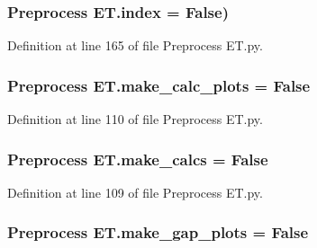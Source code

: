 \hypertarget{namespace_preprocess_01_e_t_aadaeace54973ac1d38ec6c6b5267a119}{}
\subsubsection[{index}]{\setlength{\rightskip}{0pt plus 5cm}Preprocess E\+T.\+index = False)}\label{namespace_preprocess_01_e_t_aadaeace54973ac1d38ec6c6b5267a119}


Definition at line 165 of file Preprocess E\+T.\+py.

\hypertarget{namespace_preprocess_01_e_t_a56359fcc3c93b1624e18648ebd54b0ac}{}
\subsubsection[{make\+\_\+calc\+\_\+plots}]{\setlength{\rightskip}{0pt plus 5cm}Preprocess E\+T.\+make\+\_\+calc\+\_\+plots = False}\label{namespace_preprocess_01_e_t_a56359fcc3c93b1624e18648ebd54b0ac}


Definition at line 110 of file Preprocess E\+T.\+py.

\hypertarget{namespace_preprocess_01_e_t_a9232b305c8f0040028a54ba9cbaadf09}{}
\subsubsection[{make\+\_\+calcs}]{\setlength{\rightskip}{0pt plus 5cm}Preprocess E\+T.\+make\+\_\+calcs = False}\label{namespace_preprocess_01_e_t_a9232b305c8f0040028a54ba9cbaadf09}


Definition at line 109 of file Preprocess E\+T.\+py.

\hypertarget{namespace_preprocess_01_e_t_ae27e269ff9fd7f96b7639c7417e34ab0}{}
\subsubsection[{make\+\_\+gap\+\_\+plots}]{\setlength{\rightskip}{0pt plus 5cm}Preprocess E\+T.\+make\+\_\+gap\+\_\+plots = False}\label{namespace_preprocess_01_e_t_ae27e269ff9fd7f96b7639c7417e34ab0}


